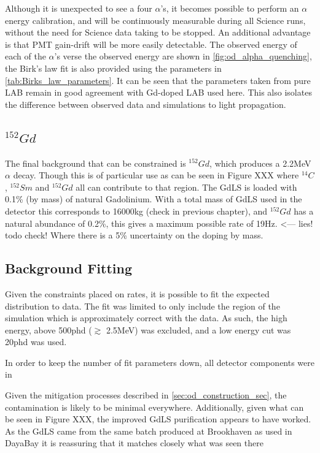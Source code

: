 \par
Although it is unexpected to see a four $\alpha$'s, it becomes possible to perform an $\alpha$ energy calibration, and will be continuously measurable during all Science runs, without the need for Science data taking to be stopped.
An additional advantage is that PMT gain-drift will be more easily detectable.
The observed energy of each of the $\alpha$'s verse the observed energy are shown in \autoref{fig:od_alpha_quenching}, the Birk's law fit is also provided using the parameters in \autoref{tab:Birks_law_parameters}.
It can be seen that the parameters taken from pure LAB remain in good agreement with Gd-doped LAB used here.
This also isolates the difference between observed data and simulations to light propagation.



\subsection{${}^{152}Gd$}
\par
The final background that can be constrained is ${}^{152}Gd$, which produces a 2.2MeV $\alpha$ decay.
Though this is of particular use as can be seen in Figure XXX where ${}^{14}C$, ${}^{152}Sm$ and ${}^{152}Gd$ all can contribute to that region.
The GdLS is loaded with 0.1\% (by mass) of natural Gadolinium.
With a total mass of GdLS used in the detector this corresponds to 16000kg (check in previous chapter), and ${}^{152}Gd$ has a natural abundance of 0.2\%, this gives a maximum possible rate of 19Hz. <--- lies! todo check!
Where there is a 5\% uncertainty on the doping by mass.

\subsection{Background Fitting}
\par
Given the constraints placed on rates, it is possible to fit the expected distribution to data. 
The fit was limited to only include the region of the simulation which is approximately correct with the data. 
As such, the high energy, above 500phd ($\gtrsim$ 2.5MeV) was excluded, and a low energy cut was 20phd was used.
\par
In order to keep the number of fit parameters down, all detector components were in


Given the mitigation processes described in \autoref{sec:od_construction_sec}, the contamination is likely to be minimal everywhere. 
Additionally, given what can be seen in Figure XXX, the improved GdLS purification appears to have worked.
As the GdLS came from the same batch produced at Brookhaven as used in DayaBay it is reassuring that it matches closely what was seen there

